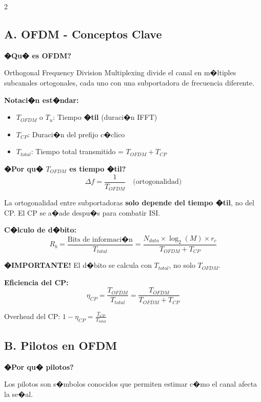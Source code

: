 ﻿\documentclass[8pt,a4paper]{article}
\begin{document}
\begin{multicols}{2}
\footnotesize

\subsection*{\small A. OFDM - Conceptos Clave}
\vspace{-2mm}

\textbf{�Qu� es OFDM?}

Orthogonal Frequency Division Multiplexing divide el canal en m�ltiples subcanales ortogonales, cada uno con una subportadora de frecuencia diferente.

\textbf{Notaci�n est�ndar:}
\begin{itemize}[leftmargin=*,itemsep=2pt]
    \item $T_{OFDM}$ o $T_u$: Tiempo \textbf{�til} (duraci�n IFFT)
    \item $T_{CP}$: Duraci�n del prefijo c�clico
    \item $T_{total}$: Tiempo total transmitido = $T_{OFDM} + T_{CP}$
\end{itemize}

\textbf{�Por qu� $T_{OFDM}$ es tiempo �til?}
\[
\boxed{\Delta f = \frac{1}{T_{OFDM}}} \quad \text{(ortogonalidad)}
\]

La ortogonalidad entre subportadoras \textbf{solo depende del tiempo �til}, no del CP. El CP se a�ade despu�s para combatir ISI.

\textbf{C�lculo de d�bito:}
\[
\boxed{R_b = \frac{\text{Bits de informaci�n}}{T_{total}} = \frac{N_{data} \times \log_2(M) \times r_c}{T_{OFDM} + T_{CP}}}
\]

\textbf{�IMPORTANTE!} El d�bito se calcula con $T_{total}$, no solo $T_{OFDM}$.

\textbf{Eficiencia del CP:}
\[
\eta_{CP} = \frac{T_{OFDM}}{T_{total}} = \frac{T_{OFDM}}{T_{OFDM} + T_{CP}}
\]

Overhead del CP: $1 - \eta_{CP} = \frac{T_{CP}}{T_{total}}$

\vspace{-2mm}
\subsection*{\small B. Pilotos en OFDM}
\vspace{-2mm}

\textbf{�Por qu� pilotos?}

Los pilotos son s�mbolos conocidos que permiten estimar c�mo el canal afecta la se�al.


\end{multicols}
\end{document}
